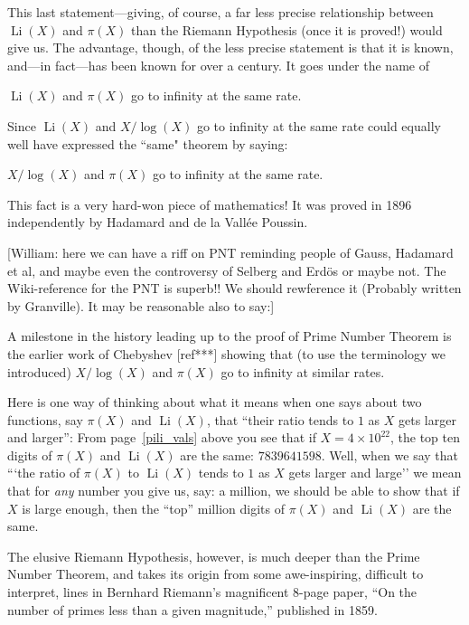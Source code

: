 \documentclass[11pt,draft]{article}
\DeclareMathOperator{\Li}{Li}
\theoremstyle{plain}
\theoremstyle{definition}
\numberwithin{equation}{section}
\numberwithin{figure}{section}
\numberwithin{table}{section}
\begin{document}
This last statement---giving, of course, a far less precise
relationship between $\Li(X)$ and $\pi(X)$ than the Riemann Hypothesis
(once it is proved!) would give us.  The advantage, though, of the
less precise statement is that it is known, and---in fact---has been
known for over a century. It goes under the name of
  
\vskip10pt
  $\Li(X)$ and $\pi(X)$ go to infinity at the same rate.
   \vskip10pt

   Since $\Li(X)$ and $X/\log(X)$ go to infinity at the same rate could
   equally well have expressed the ``same" theorem by saying:

  \vskip10pt
   $X/\log(X)$ and $\pi(X)$ go to infinity at the same rate.
   \vskip10pt
    
   This fact is a very hard-won piece of mathematics!  It was proved
   in 1896 independently by Hadamard and de la Vall\'{e}e Poussin.

   [William: here we can have a riff on PNT reminding people of Gauss,
   Hadamard et al, and maybe even the controversy of Selberg and
   Erd{\"o}s or maybe not. The Wiki-reference for the PNT is superb!!
   We should rewference it (Probably written by Granville).  It may be
   reasonable also to say:]

        \vskip10pt
        
        A milestone in the history leading up to the proof of Prime
        Number Theorem is the earlier work of Chebyshev [ref***]
        showing that (to use the terminology we introduced)
        $X/\log(X)$ and $\pi(X)$ go to infinity at similar rates.
        \vskip15pt

Here is one way of thinking about what it means when one says about
two functions, say $\pi(X)$ and $\Li(X)$, that ``their ratio tends to
$1$ as $X$ gets larger and larger'': From page~\ref{pili_vals} above
you see that if $X = 4\times 10^{22}$, the top ten digits of $\pi (X)$
and $\Li(X)$ are the same: $7839641598$.  Well, when we say that ```the
ratio of $\pi(X)$ to $\Li(X)$ tends to $1$ as $X$ gets larger and
large'' we mean that for {\em any} number you give us, say: a million,
we should be able to show that if $X$ is large enough, then the
``top'' million digits of $\pi (X)$ and $\Li(X)$ are the same.

The elusive Riemann Hypothesis, however, is much deeper than the Prime
Number Theorem, and takes its origin from some awe-inspiring,
difficult to interpret, lines in Bernhard Riemann's magnificent 8-page
paper, ``On the number of primes less than a given magnitude,''
published in 1859. 
 
\end{document}
